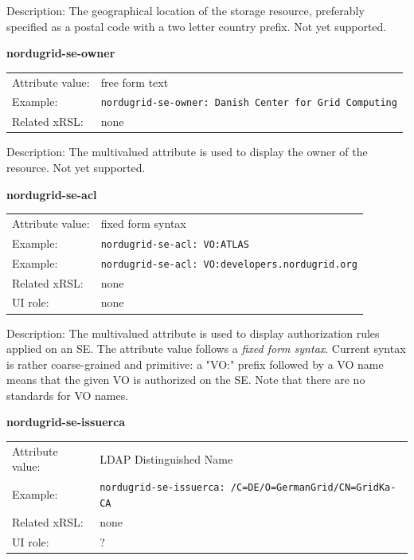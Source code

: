 \documentclass{article}
\begin{document}
Description: 
The geographical location of the storage resource, preferably
specified as a postal code with a two letter country prefix.
Not yet supported.


  \hspace*{0.5cm}
  \begin{shaded}
    \textbf{nordugrid-se-owner}
  \end{shaded}
  \begin{tabular}{lp{10cm}}  
    Attribute value:& free form text\\
    Example:& \verb#nordugrid-se-owner: Danish Center for Grid Computing#\\
    Related xRSL:& none\\
  \end{tabular}

Description: The multivalued attribute is used to display the owner of the resource.
Not yet supported.


  \hspace*{0.5cm}
  \begin{shaded}
    \textbf{nordugrid-se-acl}
  \end{shaded}
  \begin{tabular}{lp{10cm}}  
    Attribute value:& fixed form syntax\\
    Example:& \verb#nordugrid-se-acl: VO:ATLAS#\\
    Example:& \verb#nordugrid-se-acl: VO:developers.nordugrid.org#\\
    Related xRSL:& none\\
    UI role:& none\\
  \end{tabular}

Description: The multivalued attribute is used to display authorization rules 
applied on an SE. The attribute value follows a {\it fixed form syntax}.
Current syntax is rather coarse-grained and primitive: a "VO:" prefix followed by a VO name 
means that the given VO is authorized on the SE. 
Note that there are no standards for VO names.


  \hspace*{0.5cm}
  \begin{shaded}
    \textbf{nordugrid-se-issuerca}
  \end{shaded}
  \begin{tabular}{lp{10cm}}  
    Attribute value:& LDAP Distinguished Name\\
    Example:& \verb#nordugrid-se-issuerca: /C=DE/O=GermanGrid/CN=GridKa-CA#\\
    Related xRSL:& none\\
    UI role:& ?\\ 
  \end{tabular}
\end{document}
